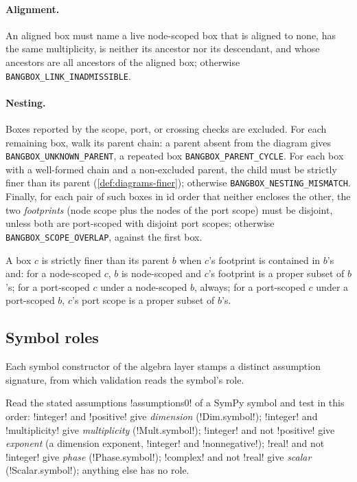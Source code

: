\paragraph{Alignment.} An aligned box must name a live node-scoped box that is aligned to none, has the same multiplicity, is neither its ancestor nor its descendant, and whose ancestors are all ancestors of the aligned box; otherwise \texttt{BANGBOX\_LINK\_INADMISSIBLE}.

\paragraph{Nesting.} Boxes reported by the scope, port, or crossing checks are excluded. For each remaining box, walk its parent chain: a parent absent from the diagram gives \texttt{BANGBOX\_UNKNOWN\_PARENT}, a repeated box \texttt{BANGBOX\_PARENT\_CYCLE}. For each box with a well-formed chain and a non-excluded parent, the child must be strictly finer than its parent (\cref{def:diagrams-finer}); otherwise \texttt{BANGBOX\_NESTING\_MISMATCH}. Finally, for each pair of such boxes in id order that neither encloses the other, the two \emph{footprints} (node scope plus the nodes of the port scope) must be disjoint, unless both are port-scoped with disjoint port scopes; otherwise \texttt{BANGBOX\_SCOPE\_OVERLAP}, against the first box.

\begin{definition}\label{def:diagrams-finer}
A box $c$ is strictly finer than its parent $b$ when $c$'s footprint is contained in $b$'s and: for a node-scoped $c$, $b$ is node-scoped and $c$'s footprint is a proper subset of $b$'s; for a port-scoped $c$ under a node-scoped $b$, always; for a port-scoped $c$ under a port-scoped $b$, $c$'s port scope is a proper subset of $b$'s.
\end{definition}

\subsection{Symbol roles}\label{sec:diagrams-validate-roles}

Each symbol constructor of the algebra layer stamps a distinct assumption signature, from which validation reads the symbol's role.

\begin{definition}\label{def:diagrams-roles}
Read the stated assumptions \py!assumptions0! of a SymPy symbol and test in this order: \code!integer! and \code!positive! give \emph{dimension} (\py!Dim.symbol!); \code!integer! and \code!multiplicity! give \emph{multiplicity} (\py!Mult.symbol!); \code!integer! and not \code!positive! give \emph{exponent} (a dimension exponent, \code!integer! and \code!nonnegative!); \code!real! and not \code!integer! give \emph{phase} (\py!Phase.symbol!); \code!complex! and not \code!real! give \emph{scalar} (\py!Scalar.symbol!); anything else has no role.
\end{definition}

